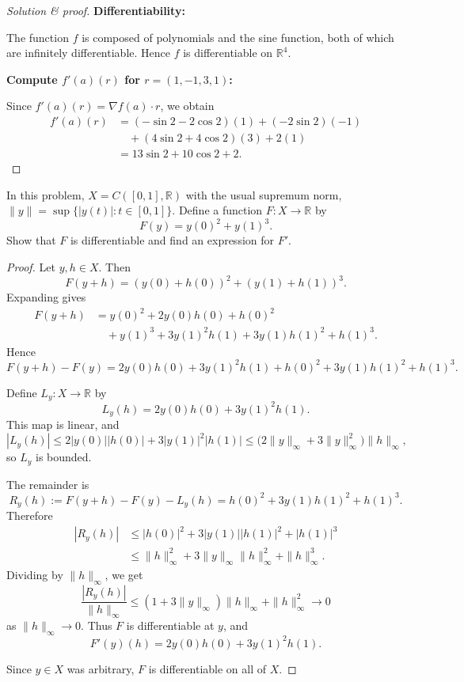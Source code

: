 \begin{proof}[Solution \& proof]
    \medskip
    \noindent\textbf{Differentiability:}

    The function \(f\) is composed of polynomials and the sine 
    function, both of which are infinitely differentiable. 
    Hence \(f\) is differentiable on \(\mathbb R^4\).

    \medskip
    \noindent\textbf{Compute \(f'(a)(r)\) for \(r = (1,-1,3,1)\):}

    Since \(f'(a)(r) = \nabla f(a)\cdot r\), we obtain
    \begin{align*}
        f'(a)(r)
        &= (-\sin 2 - 2\cos 2)(1) + (-2\sin 2)(-1) \\
        &\quad + (4\sin 2 + 4\cos 2)(3) + 2(1) \\
        &= 13\sin 2 + 10\cos 2 + 2.
    \end{align*}
\end{proof}
\begin{prob}
    In this problem, $X = C([0,1], \mathbb R)$ with the 
    usual supremum norm, $\|y\| = \sup\{|y(t)| : t \in [0,1]\}$. 
    Define a function $F: X \to \mathbb R$ by 
    \[
        F(y) = y(0)^2 + y(1)^3.
    \]
    Show that $F$ is differentiable and find an expression 
    for $F'$.
\end{prob}
\begin{proof}
    Let \(y,h \in X\). Then
    \[
        F(y+h) = (y(0)+h(0))^2 + (y(1)+h(1))^3.
    \]
    Expanding gives
    \begin{align*}
        F(y+h)
        &= y(0)^2 + 2y(0)h(0) + h(0)^2 \\
        &\quad + y(1)^3 + 3y(1)^2h(1) + 3y(1)h(1)^2 + h(1)^3.
    \end{align*}
    Hence
    \[
        F(y+h)-F(y)
        = 2y(0)h(0) + 3y(1)^2h(1)
        + h(0)^2 + 3y(1)h(1)^2 + h(1)^3.
    \]

    Define \(L_y : X \to \mathbb R\) by
    \[
        L_y(h) = 2y(0)h(0) + 3y(1)^2h(1).
    \]
    This map is linear, and
    \[
        |L_y(h)|
        \le 2|y(0)||h(0)| + 3|y(1)|^2|h(1)|
        \le \bigl(2\|y\|_\infty + 3\|y\|_\infty^2\bigr)\|h\|_\infty,
    \]
    so \(L_y\) is bounded.

    The remainder is
    \[
        R_y(h)
        := F(y+h)-F(y)-L_y(h)
        = h(0)^2 + 3y(1)h(1)^2 + h(1)^3.
    \]
    Therefore
    \begin{align*}
        |R_y(h)|
        &\le |h(0)|^2 + 3|y(1)||h(1)|^2 + |h(1)|^3 \\
        &\le \|h\|_\infty^2 + 3\|y\|_\infty \|h\|_\infty^2 + \|h\|_\infty^3.
    \end{align*}
    Dividing by \(\|h\|_\infty\), we get
    \[
        \frac{|R_y(h)|}{\|h\|_\infty}
        \le (1+3\|y\|_\infty)\|h\|_\infty + \|h\|_\infty^2 \to 0
    \]
    as \(\|h\|_\infty \to 0\). Thus \(F\) is differentiable at \(y\), and
    \[
        F'(y)(h)=2y(0)h(0)+3y(1)^2h(1).
    \]

    Since \(y \in X\) was arbitrary, \(F\) is differentiable on all of \(X\).
\end{proof}

